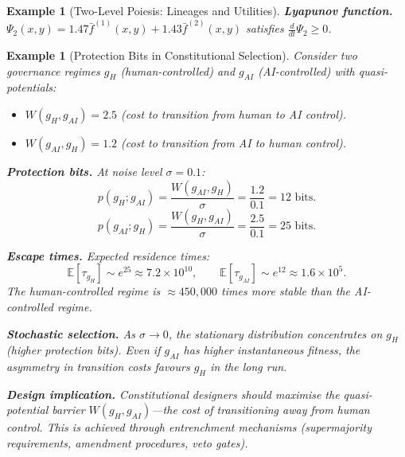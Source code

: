 \documentclass[12pt]{article}
\newtheorem{example}[theorem]{Example}
\newcommand{\E}{\mathbb{E}}
\begin{document}
\begin{example}[Two-Level Poiesis: Lineages and Utilities]
\textbf{Lyapunov function.} $\Psi_2(x, y) = 1.47 \bar{f}^{(1)}(x, y) + 1.43 \bar{f}^{(2)}(x, y)$ satisfies $\frac{d}{dt}\Psi_2 \geq 0$.
\end{example}

\begin{example}[Protection Bits in Constitutional Selection]
\label{ex:protection-bits}
Consider two governance regimes $g_H$ (human-controlled) and $g_{AI}$ (AI-controlled) with quasi-potentials:
\begin{itemize}
    \item $W(g_H, g_{AI}) = 2.5$ (cost to transition from human to AI control).
    \item $W(g_{AI}, g_H) = 1.2$ (cost to transition from AI to human control).
\end{itemize}

\textbf{Protection bits.} At noise level $\sigma = 0.1$:
\[
p(g_H; g_{AI}) = \frac{W(g_{AI}, g_H)}{\sigma} = \frac{1.2}{0.1} = 12 \text{ bits}.
\]
\[
p(g_{AI}; g_H) = \frac{W(g_H, g_{AI})}{\sigma} = \frac{2.5}{0.1} = 25 \text{ bits}.
\]

\textbf{Escape times.} Expected residence times:
\[
\E[\tau_{g_H}] \sim e^{25} \approx 7.2 \times 10^{10}, \qquad \E[\tau_{g_{AI}}] \sim e^{12} \approx 1.6 \times 10^5.
\]
The human-controlled regime is $\approx 450,000$ times more stable than the AI-controlled regime.

\textbf{Stochastic selection.} As $\sigma \to 0$, the stationary distribution concentrates on $g_H$ (higher protection bits). Even if $g_{AI}$ has higher instantaneous fitness, the asymmetry in transition costs favours $g_H$ in the long run.

\textbf{Design implication.} Constitutional designers should maximise the quasi-potential barrier $W(g_H, g_{AI})$---the cost of transitioning away from human control. This is achieved through entrenchment mechanisms (supermajority requirements, amendment procedures, veto gates).
\end{example}
\end{document}
